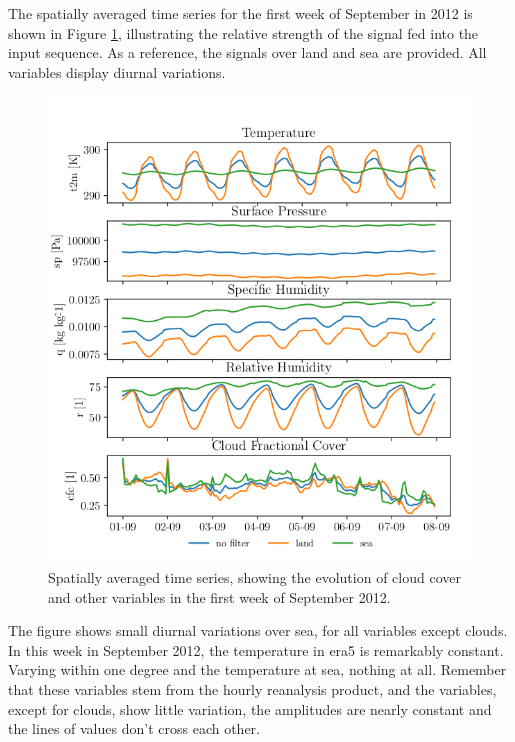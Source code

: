 The spatially averaged time series for the first week of September in 2012 is shown in Figure \ref{fig:first_week_sep_2012}, illustrating the relative strength of the signal fed into the input sequence. As a reference, the signals over land and sea are provided. All variables display diurnal variations. 
\begin{figure}[ht]
    \centering
    \includegraphics{python_figs/spatially_averaged_one_week_from_2012-09-01.png}
    \caption{Spatially averaged time series, showing the evolution of cloud cover and other variables in the first week of September 2012.}
    \label{fig:first_week_sep_2012}
\end{figure}
The figure shows small diurnal variations over sea, for all variables except clouds. In this week in September 2012, the temperature in \acrshort{era5} is remarkably constant. Varying within one degree and the temperature at sea, nothing at all. Remember that these variables stem from the hourly reanalysis product, and the variables, except for clouds, show little variation, the amplitudes are nearly constant and the lines of values don't cross each other. 


